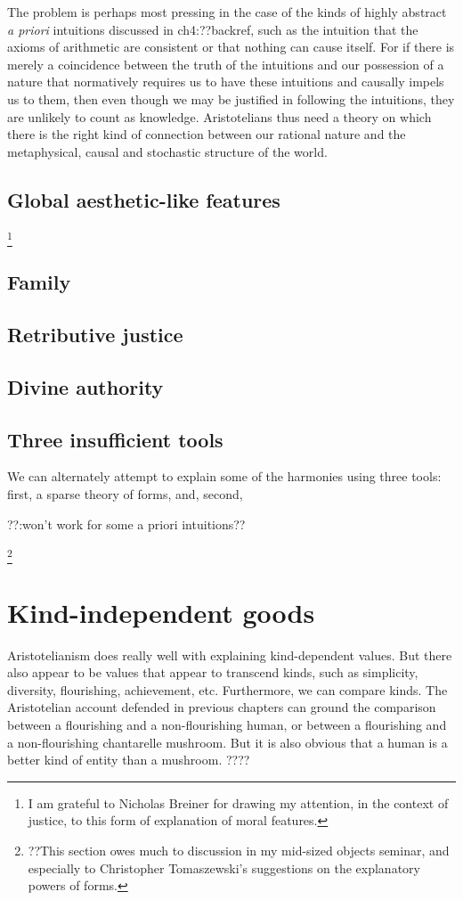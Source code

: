 The problem is perhaps most pressing in the case of the kinds of highly abstract \textit{a priori} intuitions discussed in ch4:??backref,
such as the intuition that the axioms of arithmetic are consistent or that nothing can cause itself. For if there is merely a coincidence
between the truth of the intuitions and our possession of  a nature that normatively requires us to have these intuitions and causally 
impels us to them, then even though we may be justified in following the intuitions, they are unlikely to count as knowledge.
Aristotelians thus need a theory on which there is the right kind of connection between our rational nature and the metaphysical, causal and 
stochastic structure of the world. 

\subsection{Global aesthetic-like features}\footnote{I am grateful to Nicholas Breiner for drawing my attention, in the context of
justice, to this form of explanation of moral features.}
\subsection{Family}
\subsection{Retributive justice}
\subsection{Divine authority}


\subsection{Three insufficient tools}
We can alternately attempt to explain some of the harmonies using three tools: first, a sparse theory of forms, and, second, 

??:won't work for some a priori intuitions??

\footnote{??This section owes much to discussion in my mid-sized objects seminar, and especially to Christopher Tomaszewski's suggestions on the explanatory powers of forms.}


\section{Kind-independent goods}
Aristotelianism does really well with explaining kind-dependent values. But there also appear to be values that appear
to transcend kinds, such as simplicity, diversity, flourishing, achievement, etc. Furthermore, we can compare kinds.
The Aristotelian account defended in previous chapters can ground the comparison between a flourishing and a non-flourishing 
human, or between a flourishing and a non-flourishing chantarelle mushroom. But it is also obvious that a human is a better
kind of entity than a mushroom.
????

